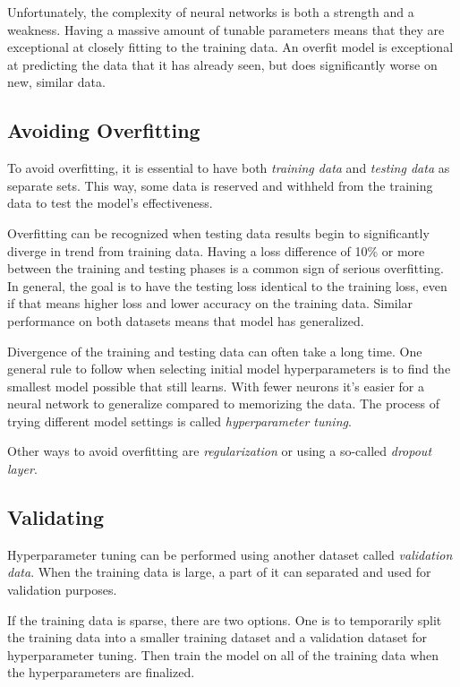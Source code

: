 \documentclass[a4paper]{report}
\begin{document}
Unfortunately, the complexity of neural networks is both a strength and a weakness. Having a massive amount of tunable parameters means that they are exceptional at closely fitting to the training data. An overfit model is exceptional at predicting the data that it has already seen, but does significantly worse on new, similar data.

\subsection*{Avoiding Overfitting}
To avoid overfitting, it is essential to have both \emph{training data} and \emph{testing data} as separate sets. This way, some data is reserved and withheld from the training data to test the model's effectiveness. 

Overfitting can be recognized when testing data results begin to significantly diverge in trend from training data. Having a loss difference of 10\% or more between the training and testing phases is a common sign of serious overfitting. In general, the goal is to have the testing loss identical to the training loss, even if that means higher loss and lower accuracy on the training data. Similar performance on both datasets means that model has generalized.

Divergence of the training and testing data can often take a long time. One general rule to follow when selecting initial model hyperparameters is to find the smallest model possible that still learns. With fewer neurons it's easier for a neural network to generalize compared to memorizing the data. The process of trying different model settings is called \emph{hyperparameter tuning}.

Other ways to avoid overfitting are \emph{regularization} or using a so-called \emph{dropout layer}. 

\subsection*{Validating}
Hyperparameter tuning can be performed using another dataset called \emph{validation data}. When the training data is large, a part of it can separated and used for validation purposes.

If the training data is sparse, there are two options. One is to temporarily split the training data into a smaller training dataset and a validation dataset for hyperparameter tuning. Then train the model on all of the training data when the hyperparameters are finalized.
\end{document}
